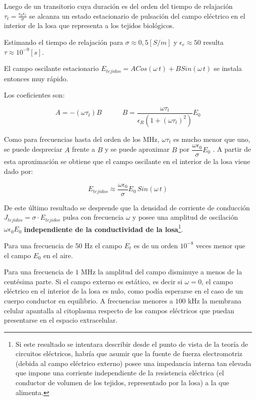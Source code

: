 \begin{sloppypar}
Luego de un transitorio cuya duración es del orden del tiempo de relajación ${\tau_{t}=\frac{\epsilon_{0}\epsilon_{r}}{\sigma}}$ se alcanza un estado estacionario de pulsación del campo eléctrico en el interior de la losa que representa a los tejidos biológicos.


Estimando el tiempo de relajación para $\sigma\approx0,5[S/m]$ y ${\epsilon_{r}\approx 50}$ resulta ${\tau\approx 10^{-9}[s]}$.
\end{sloppypar}


El campo oscilante estacionario $E_{tejidos}= ACos(\omega\,t)+BSin(\omega\,t)$ se instala entonces muy rápido.

Los coeficientes son:

\begin{equation}
	A=-(\omega\tau_{t})B \quad \quad \quad B= \dfrac{\omega\tau_{t}}{\epsilon_{R}(1+(\omega\tau_{t})^{2})} E_{0}
\end{equation}

Como para frecuencias hasta del orden de los MHz, $\omega\tau_{t}$ es mucho menor que uno, se puede despreciar $A$ frente a $B$ y se puede aproximar $B$ por $\dfrac{\omega\epsilon_{0}}{\sigma}E_{0}$ .
A partir de esta aproximación se obtiene que el campo oscilante en el interior de la losa viene dado por:



\begin{equation}
	E_{tejidos} \approx \dfrac{\omega\epsilon_{0}}{\sigma}E_{0}\, Sin(\omega\,t)
\end{equation}

De este último resultado se desprende que la densidad de corriente de conducción $J_{tejidos}=\sigma\cdot E_{tejidos}$ pulsa con frecuencia $\omega$ y posee una amplitud de oscilación $\omega\epsilon_{0}E_{0}$ \textbf{independiente de la conductividad de la losa}\footnote{Si este resultado se intentara describir desde el punto de vista de la teoría de circuitos eléctricos, habría que asumir que la fuente de fuerza electromotriz (debida al campo eléctrico externo) posee una impedancia interna tan elevada que impone una corriente independiente de la resistencia eléctrica (el conductor de volumen de los tejidos, representado por la losa) a la que alimenta.}.

Para una frecuencia de 50 Hz el campo $E_{t}$ es de un orden $10^{-8}$ veces menor que el campo $E_{0}$ en el aire.

Para una frecuencia de $1$ MHz la amplitud del campo disminuye a menos de la centésima parte.
Si el campo externo es estático, es decir si $\omega=0$, el campo eléctrico en el interior de la losa es nulo, como podía esperarse en el caso de un cuerpo conductor en equilibrio.
A frecuencias menores a $100$ kHz la membrana celular apantalla al citoplasma respecto de los campos eléctricos que puedan presentarse en el espacio extracelular.

